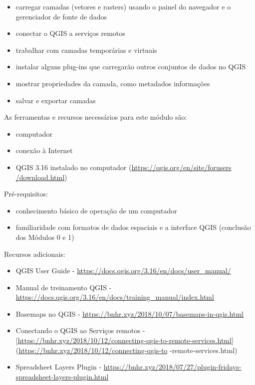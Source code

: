 \documentclass[
]{krantz}
\providecommand{\tightlist}{%
  \setlength{\itemsep}{0pt}\setlength{\parskip}{0pt}}
\begin{document}
\begin{itemize}
\tightlist
\item
  carregar camadas (vetores e rasters) usando o painel do navegador e o gerenciador de fonte de dados
\item
  conectar o QGIS a serviços remotos
\item
  trabalhar com camadas temporárias e virtuais
\item
  instalar alguns plug-ins que carregarão outros conjuntos de dados no QGIS
\item
  mostrar propriedades da camada, como metadados informações
\item
  salvar e exportar camadas
\end{itemize}

As ferramentas e recursos necessários para este módulo são:

\begin{itemize}
\tightlist
\item
  computador
\item
  conexão à Internet
\item
  QGIS 3.16 instalado no computador (\href{https://qgis.org/en/site/forusers/download.html}{https://qgis.org/en/site/forusers /download.html})
\end{itemize}

Pré-requisitos:

\begin{itemize}
\tightlist
\item
  conhecimento básico de operação de um computador
\item
  familiaridade com formatos de dados espaciais e a interface QGIS (conclusão dos Módulos 0 e 1)
\end{itemize}

Recursos adicionais:

\begin{itemize}
\tightlist
\item
  QGIS User Guide - \url{https://docs.qgis.org/3.16/en/docs/user_manual/}
\item
  Manual de treinamento QGIS - \url{https://docs.qgis.org/3.16/en/docs/training_manual/index.html}
\item
  Basemaps no QGIS - \url{https://bnhr.xyz/2018/10/07/basemaps-in-qgis.html}
\item
  Conectando o QGIS ao Serviços remotos - {[}\url{https://bnhr.xyz/2018/10/12/connecting-qgis-to-remote-services.html}{]} (\url{https://bnhr.xyz/2018/10/12/connecting-qgis-to} -remote-services.html)
\item
  Spreadsheet Layers Plugin - \href{https://bnhr.xyz/2018/\%2027/07\%20/\%20plugin-fridays-spreadsheet-layers-plugin.html}{https://bnhr.xyz/2018/07/27/plugin-fridays-spreadsheet-layers-plugin.html}
\end{itemize}
\end{document}

